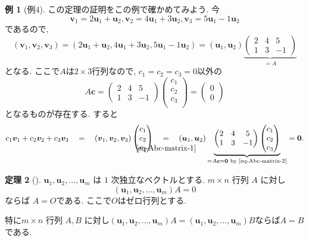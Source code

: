\documentclass[dvipdfmx,a4paper,11pt]{article} %
\newcommand{\underalign}[2]{%
  \quad
  \underset{\mathclap{\raisebox{-1.6ex}{\ensuremath{\scriptstyle #1}}}}{#2}
  \quad
}
\theoremstyle{definition}
\newtheorem{thm}{定理}[section]
\newtheorem{eg}[thm]{例}
\begin{document}
\begin{eg}[例4]
この定理の証明をこの例で確かめてみよう. 
今
$$
\bm{v}_1=2\bm{u}_1+\bm{u}_2, \bm{v}_2=4\bm{u}_1+3\bm{u}_2, \bm{v}_3=5\bm{u}_1-1\bm{u}_2
$$
であるので, 
\begin{equation}
\label{eq-Abc-matrix-1}
(\bm{v}_1, \bm{v}_2, \bm{v}_3) =(2\bm{u}_1+\bm{u}_2, 4\bm{u}_1+3\bm{u}_2, 5\bm{u}_1-1\bm{u}_2)
=(\bm{u}_1,\bm{u}_2)
\underbrace{\begin{pmatrix}
2&4&5\\
1&3&-1
\end{pmatrix}}_{=A}
\end{equation}
となる. ここで$A$は$2 \times 3$行列なので, 
$c_1=c_2=c_3=0$以外の
\begin{equation}
\label{eq-Abc-matrix-2}
A \bm{c}=
\begin{pmatrix}
2&4&5\\
1&3&-1
\end{pmatrix}
\begin{pmatrix}
c_1\\
c_2\\
c_3\\
\end{pmatrix}
=
\begin{pmatrix}
0\\
0
\end{pmatrix}
\end{equation}
となるものが存在する. 
すると
$$
c_1\bm{v}_1 + c_2 \bm{v}_2 + c_3 \bm{v}_3
\underalign{}{=}
(\bm{v}_1, \bm{v}_2, \bm{v}_3)
\begin{pmatrix}
c_1\\
c_2\\
c_3\\
\end{pmatrix}
\underalign{\eqref{eq-Abc-matrix-1}}{=}
(\bm{u}_1,\bm{u}_2)
\underbrace{
\begin{pmatrix}
2&4&5\\
1&3&-1
\end{pmatrix}
\begin{pmatrix}
c_1\\
c_2\\
c_3\\
\end{pmatrix}
}_{=A \bm{c}=\bm{0} \text{ by \eqref{eq-Abc-matrix-2}}}
=\bm{0}.
$$

\end{eg}


\begin{thm}[{\cite[定理4.2.4, 定理4.2.5]{M}}] 
\(\bm{u}_1,\bm{u}_2,\ldots,\bm{u}_m\) は \(1\) 次独立なベクトルとする.
\(m\times n\) 行列 \(A\) に対し
\[
(\bm{u}_1,\bm{u}_2,\ldots,\bm{u}_m)A=0
\]
ならば \(A=O\)である. ここで$O$はゼロ行列とする.  

特に\(m\times n\) 行列 \(A, B\) に対し$(\bm{u}_1,\bm{u}_2,\ldots,\bm{u}_m)A=(\bm{u}_1,\bm{u}_2,\ldots,\bm{u}_m)B$ならば$A=B$である. 
\end{thm}
\end{document}
